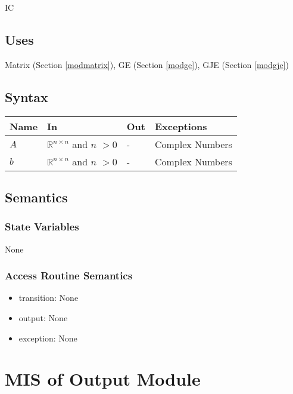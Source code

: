 \documentclass[12pt, titlepage]{article}
\begin{document}
IC


\subsection{Uses}
Matrix (Section \ref{modmatrix}), GE (Section \ref{modge}), GJE (Section \ref{modgje}) 


\subsection{Syntax}

\begin{center}
\begin{tabular}{p{2cm} p{4cm} p{4cm} p{2cm}}
\hline
\textbf{Name} & \textbf{In} & \textbf{Out} & \textbf{Exceptions} \\
\hline
$A$ & $\mathbb{R}^{n \times n}$ and $n$ $> 0$ & - & Complex Numbers \\
$b$ & $\mathbb{R}^{n \times n}$ and $n$ $> 0$ & - & Complex Numbers \\
\hline
\end{tabular}
\end{center}

\subsection{Semantics}

\subsubsection{State Variables}

None


\subsubsection{Access Routine Semantics}

\noindent %
\begin{itemize}
\item transition: None %
\item output: None %
\item exception: None %
\end{itemize}

\newpage


\section{MIS of {Output Module}} \label{modoc} %
\end{document}
